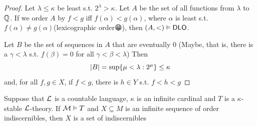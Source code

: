 \documentclass[11pt]{article}
\begin{document}
\begin{proof}
Let \(\lambda\le\kappa\) be least s.t. \(2^\lambda>\kappa\). Let \(A\) be the set of all functions from \(\lambda\) to \(\mathbb{Q}\). If
we order \(A\) by \(f<g\) iff \(f(\alpha)<g(\alpha)\), where \(\alpha\) is least s.t. \(f(\alpha)\neq g(\alpha)\)(lexicographic order😁),
then \((A,<)\vDash\operatorname{\textsf{DLO}}\).

Let \(B\) be the set of sequences in \(A\) that are eventually 0
(Maybe, that is, there is a \(\gamma<\lambda\) s.t. \(f(\beta)=0\) for all \(\gamma<\beta<\lambda\))
Then
\begin{equation*}
\abs{B}=\sup\{\mu<\lambda:2^\mu\}\le\kappa
\end{equation*}
and, for all \(f,g\in X\), if \(f<g\), there is \(h\in Y\) s.t. \(f<h<g\)
\end{proof}

\begin{theorem}[]
Suppose that \(\mathcal{L}\) is a countable language, \(\kappa\) is an infinite cardinal and \(T\) is a
\(\kappa\)-stable \(\mathcal{L}\)-theory. If \(\mathcal{M}\vDash T\) and \(X\subseteq M\) is an infinite sequence of order indiscernibles,
then \(X\) is a set of indiscernibles
\end{theorem}
\end{document}
